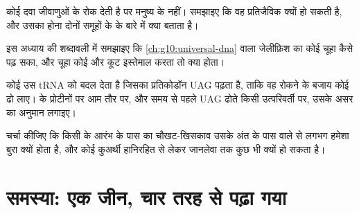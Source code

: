 \begin{exercise}[$\star\star\star$]\label{exo:g11:gene-expression:12}
कोई दवा जीवाणुओं के  रोक देती है पर मनुष्य के नहीं। समझाइए कि वह
प्रतिजैविक क्यों हो सकती है, और उसका होना दोनों समूहों के  के
बारे में क्या बताता है।
\end{exercise}

\begin{exercise}[$\star\star\star$]\label{exo:g11:gene-expression:13}
इस अध्याय की शब्दावली में समझाइए कि \cref{ch:g10:universal-dna} वाला
जेलीफ़िश का  कोई चूहा कैसे पढ़ सका, और चूहा कोई और कूट इस्तेमाल करता तो
क्या होता।
\end{exercise}

\begin{exercise}[$\star\star\star$]\label{exo:g11:gene-expression:14}
कोई  उस tRNA को बदल देता है जिसका प्रतिकोडॉन UAG पढ़ता है,
ताकि वह रोकने के बजाय कोई  ढो लाए।  के प्रोटीनों पर आम तौर
पर, और समय से पहले UAG ढोते किसी उत्परिवर्ती  पर, उसके असर का अनुमान
लगाइए।
\end{exercise}

\begin{exercise}[$\star\star\star$]\label{exo:g11:gene-expression:15}
चर्चा कीजिए कि किसी  के आरंभ के पास का चौखट-खिसकाव उसके अंत के पास वाले
से लगभग हमेशा बुरा क्यों होता है, और कोई कुअर्थी  हानिरहित से
लेकर जानलेवा तक कुछ भी क्यों हो सकता है।
\end{exercise}

\section{समस्या: एक जीन, चार तरह से पढ़ा गया}

